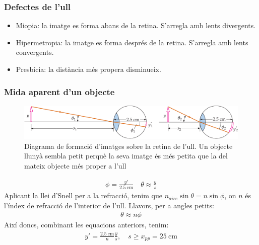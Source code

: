 \subsubsection*{Defectes de l'ull}
\begin{itemize}
    \item Miopia: la imatge es forma abans de la retina. S'arregla amb lents divergents.
    \item Hipermetropia: la imatge es forma després de la retina. S'arregla amb lents convergents.
    \item Presbícia: la distància més propera disminueix.
\end{itemize}

\subsubsection*{Mida aparent d'un objecte}
\begin{figure}[H]
\centering
    \includegraphics[width=\textwidth]{images/5/51-ull-imatge.png}
\caption{Diagrama de formació d'imatges sobre la retina de l'ull. Un objecte llunyà sembla petit perquè la seva imatge és més petita que la del mateix objecte més proper a l'ull}
\end{figure}
\begin{align}
    \boxed{\phi = \frac{y'}{\SI{2.5}{\cm}}} \quad \boxed{\theta \approx \frac{y}{s}}
\end{align}
Aplicant la llei d'Snell per a la refracció, tenim que $n_{aire} \sin \theta = n \sin \phi$, on $n$ és l'índex de refracció de l'interior de l'ull. Llavors, per a angles petits:
\begin{align}
    \boxed{\theta \approx n \phi}
\end{align}
Així doncs, combinant les equacions anteriors, tenim:
\begin{align}
    \boxed{y' = \frac{\SI{2.5}{\cm}}{n} \frac{y}{s}}, \quad s \geq x_{pp} = \SI{25}{\cm}
\end{align}

